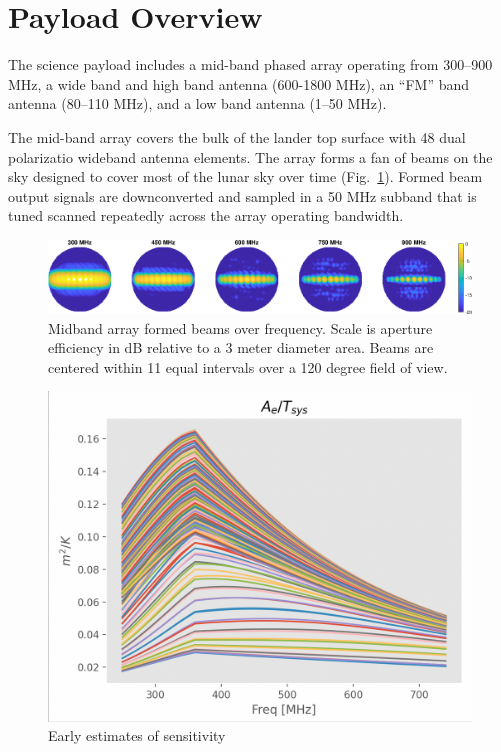 \documentclass[preprint]{aastex631}
\begin{document}
\section{Payload Overview}
\label{sec:payload}


The science payload includes a mid-band phased array operating from 300--900 MHz, a wide band and high band antenna (600-1800 MHz), an ``FM'' band antenna (80--110 MHz), and a low band antenna (1--50 MHz). 

The mid-band array covers the bulk of the lander top surface with 48 dual polarizatio wideband antenna elements. The array forms a fan of beams on the sky designed to cover most of the lunar sky over time (Fig.\ \ref{fig:midband_beam_maps}). Formed beam output signals are downconverted and sampled in a  50 MHz subband that is tuned scanned repeatedly across the array operating bandwidth. 

\begin{figure}
	\centering
	\includegraphics[width=\linewidth]{figures/midband_array_28cm_3dBSLL_beams_max.eps}
	\caption{Midband array formed beams over frequency. Scale is aperture efficiency in dB relative to a 3 meter diameter area. Beams are centered within 11 equal intervals over a 120 degree field of view.}
	\label{fig:midband_beam_maps}
\end{figure}

\begin{figure}
	\centering
	\includegraphics[width=\linewidth]{figures/sensitivity_early_est.png}
	\caption{Early estimates of sensitivity}
\end{figure}
\end{document}
